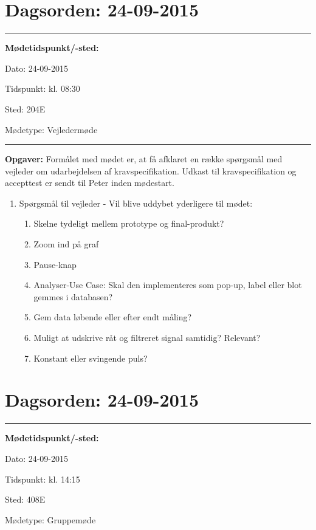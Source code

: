\newpage
\section{Dagsorden: 24-09-2015}
\hrule



\textbf{Mødetidspunkt/-sted:} 

Dato: \tabto{7em} 24-09-2015

Tidspunkt: \tabto{7em} kl. 08:30 

Sted: \tabto{7em} 204E

Mødetype: \tabto{7em} Vejledermøde \newline


\hrule
\textbf{Opgaver:} \newline
Formålet med mødet er, at få afklaret en række spørgsmål med vejleder om udarbejdelsen af kravspecifikation.
Udkast til kravspecifikation og accepttest er sendt til Peter inden mødestart.
\begin{enumerate}
\item Spørgsmål til vejleder - Vil blive uddybet yderligere til mødet:
\begin{enumerate}
\item Skelne tydeligt mellem prototype og final-produkt?
\item Zoom ind på graf
\item Pause-knap
\item Analyser-Use Case: Skal den implementeres som pop-up, label eller blot gemmes i databasen?
\item Gem data løbende eller efter endt måling?
\item Muligt at udskrive råt og filtreret signal samtidig? Relevant?
\item Konstant eller svingende puls?
\end{enumerate}
\end{enumerate}

\newpage
\section{Dagsorden: 24-09-2015}
\hrule



\textbf{Mødetidspunkt/-sted:} 

Dato: \tabto{7em} 24-09-2015

Tidspunkt: \tabto{7em} kl. 14:15

Sted: \tabto{7em} 408E

Mødetype: \tabto{7em} Gruppemøde \newline


